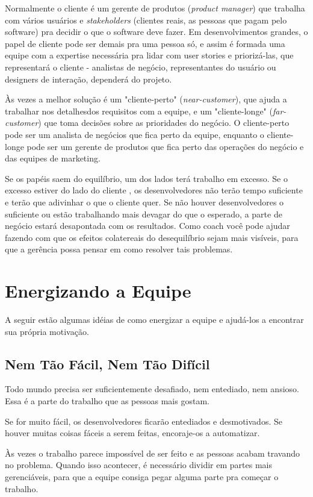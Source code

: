 \documentclass[a4paper, 10pt, font=plain]{abnt}
\begin{document}
Normalmente o cliente é um gerente de produtos (\textit{product manager}) que trabalha com vários usuários e \textit{stakeholders} (clientes reais, as pessoas que pagam pelo software) pra decidir o que o software deve fazer. Em desenvolvimentos grandes, o papel de cliente pode ser demais pra uma pessoa só, e assim é formada uma equipe com a expertise necessária pra lidar com user stories e priorizá-las, que representará o cliente - analistas de negócio, representantes do usuário ou designers de interação, dependerá do projeto.

Às vezes a melhor solução é um "cliente-perto" (\textit{near-customer}), que ajuda a trabalhar nos detalhesdos requisitos com a equipe, e um "cliente-longe" (\textit{far-customer}) que toma decisões sobre as prioridades do negócio. O cliente-perto pode ser um analista de negócios que fica perto da equipe, enquanto o cliente-longe pode ser um gerente de produtos que fica perto das operações do negócio e das equipes de marketing.

Se os papéis saem do equilíbrio, um dos lados terá trabalho em excesso. Se o excesso estiver do lado do cliente , os desenvolvedores não terão tempo suficiente e terão que adivinhar o que o cliente quer. Se não houver desenvolvedores o suficiente ou estão trabalhando mais devagar do que o esperado, a parte de negócio estará desapontada com os resultados. Como coach você pode ajudar fazendo com que os efeitos colatereais do desequilíbrio sejam mais visíveis, para que a gerência possa pensar em como resolver tais problemas.



\section{Energizando a Equipe}
A seguir estão algumas idéias de como energizar a equipe e ajudá-los a encontrar sua própria motivação.


\subsection{Nem Tão Fácil, Nem Tão Difícil}
Todo mundo precisa ser suficientemente desafiado, nem entediado, nem ansioso. Essa é a parte do trabalho que as pessoas mais gostam.

Se for muito fácil, os desenvolvedores ficarão entediados e desmotivados. Se houver muitas coisas fáceis a serem feitas, encoraje-os a automatizar.

Às vezes o trabalho parece impossível de ser feito e as pessoas acabam travando no problema. Quando isso acontecer, é necessário dividir em partes mais gerenciáveis, para que a equipe consiga pegar alguma parte pra começar o trabalho.
\end{document}
